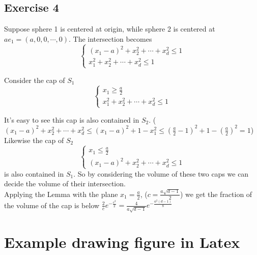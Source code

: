 \begin{sloppypar}

\subsection{Exercise 4}
Suppose sphere 1 is centered at origin, while sphere 2 is centered at $ae_1=(a,0,0,\cdots,0)$. The intersection becomes 
\begin{equation}
    \left\{
    \begin{array}{rl}
    (x_1-a)^2+x_2^2+\cdots+x_d^2\leq 1\\
    x_1^2+x_2^2+\cdots+x_d^2\leq 1
    \end{array}\right.
\end{equation}

Consider the cap of $S_1$
\begin{equation}
    \left\{
    \begin{array}{rl}
    x_1\geq \frac{a}{2}\\
    x_1^2+x_2^2+\cdots+x_d^2\leq 1
    \end{array}\right.
\end{equation}

It's easy to see this cap is also contained in $S_2$. ($(x_1-a)^2+x_2^2+\cdots+x_d^2\leq (x_1-a)^2+1-x_1^2\leq (\frac{a}{2}-1)^2+1-(\frac{a}{2})^2=1$)
Likewise the cap of $S_2$
\begin{equation}
    \left\{
    \begin{array}{rl}
        x_1\leq \frac{a}{2}\\
        (x_1-a)^2+x_2^2+\cdots+x_d^2\leq 1
    \end{array}\right.
\end{equation}
is also contained in $S_1$. So by considering the volume of these two caps we can decide the volume of their intersection.\\
Applying the Lemma with the plane $x_1=\frac{a}{2}$, ($c=\frac{a\sqrt{d-1}}{2}$) we get the fraction of the volume of the cap is below $\frac{2}{c}e^{-\frac{c^2}{2}}=\frac{4}{a\sqrt{d-1}}e^{-\frac{a^2(d-1)}{8}}$

\section{Example drawing figure in Latex}\label{drawing}


\end{sloppypar}
